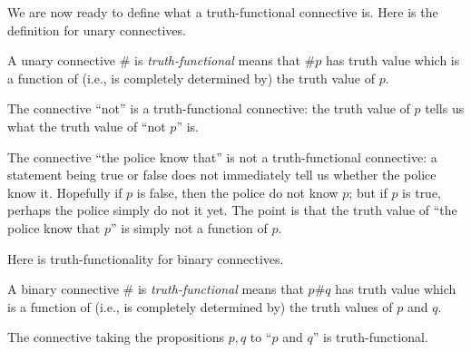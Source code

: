 We are now ready to define what a truth-functional connective is. Here is the definition for unary connectives.
\begin{definition}
	A unary connective $\#$ is \textit{truth-functional} means that $\#p$ has truth value which is a function of (i.e., is completely determined by) the truth value of $p$.
\end{definition}
\begin{example}
	The connective ``not'' is a truth-functional connective: the truth value of $p$ tells us what the truth value of ``not $p$'' is.
\end{example}
\begin{nex}
	The connective ``the police know that'' is not a truth-functional connective: a statement being true or false does not immediately tell us whether the police know it. Hopefully if $p$ is false, then the police do not know $p$; but if $p$ is true, perhaps the police simply do not it yet. The point is that the truth value of ``the police know that $p$'' is simply not a function of $p$.
\end{nex}
Here is truth-functionality for binary connectives.
\begin{definition}
	A binary connective $\#$ is \textit{truth-functional} means that $p\#q$ has truth value which is a function of (i.e., is completely determined by) the truth values of $p$ and $q$.
\end{definition}
\begin{example}
	The connective taking the propositions $p,q$ to ``$p$ and $q$'' is truth-functional.
\end{example}